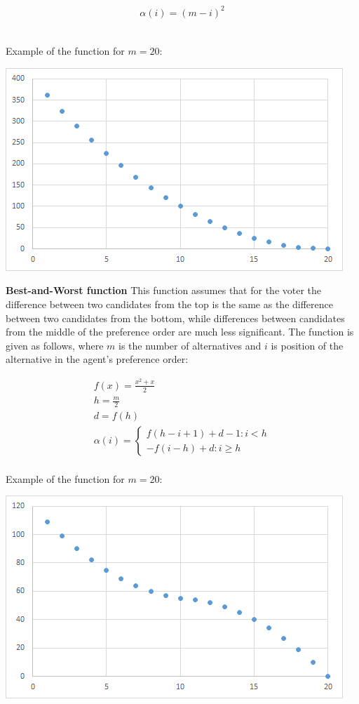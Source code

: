 \begin{gather}
	\alpha(i) = (m - i)^{2}
\end{gather}
\\

\newpage

Example of the function for $m = 20$:

\begin{center}
	\includegraphics[scale=0.75]{satfun1}
\end{center}

\noindent
\textbf{Best-and-Worst function} \hspace{.1in} This function assumes that for the voter the difference between two candidates from the top is the same as the difference between two candidates from the bottom, while differences between candidates from the middle of the preference order are much less significant. The function is given as follows, where $m$ is the number of alternatives and $i$ is position of the alternative in the agent's preference order:

\begin{gather}
	f(x) = \frac{x^{2}+x}{2} \\
	h = \frac{m}{2} \\
	d = f(h) \\
	\alpha(i) = \begin{cases} f(h-i+1)+d-1 : i<h \\ -f(i-h)+d : i \geq h \end{cases}
\end{gather}
\\

Example of the function for $m = 20$:

\begin{center}
	\includegraphics[scale=0.75]{satfun2}
\end{center}


